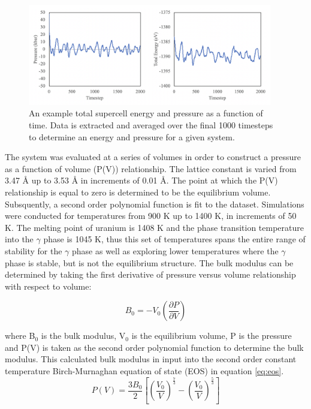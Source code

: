 \documentclass[review]{elsarticle}
\begin{document}
\begin{figure}[h]
 \centering
 \includegraphics[width=0.95\textwidth]{1_convergence.png} 
 \caption{An example total supercell energy and pressure as a function of time. Data is extracted and averaged over the final 1000 timesteps to determine an energy and pressure for a given system. }
 \label{fig:convergence}
\end{figure}

\FloatBarrier

The system was evaluated at a series of volumes in order to construct a pressure as a function of volume (P(V)) relationship. The lattice constant is varied from 3.47 {\AA} up to 3.53 {\AA} in increments of 0.01 {\AA}. The point at which the P(V) relationship is equal to zero is determined to be the equilibrium volume. Subsquently, a second order polynomial function is fit to the dataset. Simulations were conducted for temperatures from 900 K up to 1400 K, in increments of 50 K. The melting point of uranium is 1408 K and the phase transition temperature into the $\gamma$ phase is 1045 K, thus this set of temperatures spans the entire range of stability for the $\gamma$ phase as well as exploring lower temperatures where the $\gamma$ phase is stable, but is not the equilibrium structure. The bulk modulus can be determined by taking the first derivative of pressure versus volume relationship with respect to volume:

\begin{equation}
\label{eq:bulk}
B_{0} = -V_0 \left( \frac{\partial P}{\partial V} \right)
\end{equation}

where B$_0$ is the bulk modulus, V$_0$ is the equilibrium volume, P is the pressure and P(V) is taken as the second order polynomial function to determine the bulk modulus. This calculated bulk modulus in input into the second order constant temperature Birch-Murnaghan equation of state (EOS) in equation \ref{eq:eos}.
\begin{equation}
\label{eq:eos}
P(V) = \frac{3B_0}{2} \left[ \left(\frac{V_0}{V}\right)^{\frac{7}{3}} - \left(\frac{V_0}{V}\right)^{\frac{5}{3}} \right]
\end{equation}
\end{document}
